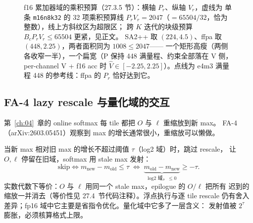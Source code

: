 \begin{figure}[H]
\caption{f16 累加器域的乘积预算（27.3.5 节）：横轴 $P_r$、纵轴 $V_r$，虚线为
单条 \texttt{m16n8k32} 的 32 项乘积预算线 $P_r V_r = 2047$（$=65504/32$，恰为整数），线上方斜纹区为超限区；
跨 $K$ 迭代的块级预算 $B_cP_rV_r \le 65504$ 更紧，见正文。
SA2++ 取 $(224,4.5)$、ffpa 取 $(448,2.25)$，两者面积同为 $1008\le2047$——
一个矩形高瘦（两侧各收窄一半），一个扁宽（P 保持 448 满量程、约束全部落在
V 侧，per-channel V + f16 acc 时 $\hat V\in[-2.25,2.25]$）。点线为 e4m3 满量程
448 的参考线：ffpa 的 $P_r$ 恰好达到它。}
\label{fig:27-pvbudget}
\end{figure}

\subsection{FA-4 lazy rescale 与量化域的交互}

第~\ref{ch:04}~章的 online softmax 每 tile 都把 $O$ 与 $\ell$ 重缩放到新 max。
FA-4（arXiv:2603.05451）观察到 max 的增长通常很小，重缩放可以懒做。

当新 max 相对旧 max 的增长不超过阈值 $\tau$（log2 域）时，跳过 rescale，
让 $O,\ell$ 停留在旧域，softmax 用 stale max 发射：
\begin{equation}
  \text{skip} \iff m_{\mathrm{new}} - m_{\mathrm{old}} \le \tau
  \;\Longleftrightarrow\;
  \underbrace{m_{\mathrm{old}} - m_{\mathrm{new}}}_{\text{log2 域，}\le 0}
  \ge -\tau .
  \label{eq:27-lazy}
\end{equation}
实数代数下等价：$O$ 与 $\ell$ 用同一个 stale max，epilogue 的 $O/\ell$ 把所有
迟到的缩放一并消去（等价性见 27.4~节代码注释）。浮点执行与逐 tile rescale
仍有舍入差异；fp16 域中它主要是省指令优化。量化域中它多了一层含义：
发射值被 $2^{\tau}$ 膨胀，必须核算格式上限。

